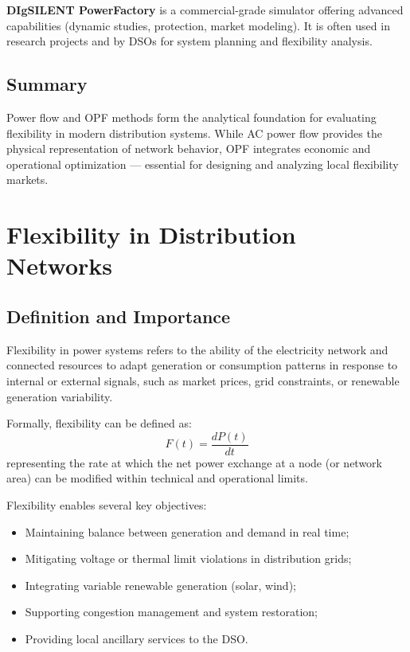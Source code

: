 \documentclass[11pt]{article}
\begin{document}
	\textbf{DIgSILENT PowerFactory} is a commercial-grade simulator offering advanced capabilities (dynamic studies, protection, market modeling).  
	It is often used in research projects and by DSOs for system planning and flexibility analysis.
	
	\subsection*{Summary}
	
	Power flow and OPF methods form the analytical foundation for evaluating flexibility in modern distribution systems.  
	While AC power flow provides the physical representation of network behavior, OPF integrates economic and operational optimization — essential for designing and analyzing local flexibility markets.
	
	
	\section{Flexibility in Distribution Networks}
	
	\subsection{Definition and Importance}
	
	Flexibility in power systems refers to the ability of the electricity network and connected resources to adapt generation or consumption patterns in response to internal or external signals, such as market prices, grid constraints, or renewable generation variability.
	
	Formally, flexibility can be defined as:
	\[
	F(t) = \frac{dP(t)}{dt}
	\]
	representing the rate at which the net power exchange at a node (or network area) can be modified within technical and operational limits.
	
	Flexibility enables several key objectives:
	\begin{itemize}
		\item Maintaining balance between generation and demand in real time;
		\item Mitigating voltage or thermal limit violations in distribution grids;
		\item Integrating variable renewable generation (solar, wind);
		\item Supporting congestion management and system restoration;
		\item Providing local ancillary services to the DSO.
	\end{itemize}
	
\end{document}
